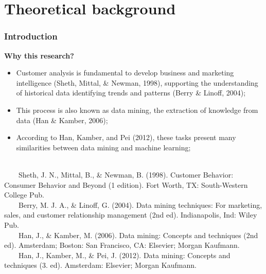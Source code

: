 \documentclass[10pt]{beamer}
\begin{document}
\section{Theoretical background}
\begin{frame}
	\frametitle{Introduction}
	\Large
	\textbf{Why this research?}\\
		\begin{itemize} \normalsize
			\item Customer analysis is fundamental to develop business and marketing intelligence \footnotesize(Sheth, Mittal, \& Newman, 1998)\normalsize, supporting the understanding of historical data identifying trends and patterns \footnotesize(Berry \& Linoff, 2004)\normalsize;
			\item This process is also known as data mining, the extraction of knowledge from data \footnotesize(Han \& Kamber, 2006)\normalsize;
			\item According to \footnotesize Han, Kamber, and Pei (2012)\normalsize, these tasks present many similarities between data mining and machine learning; \\~\\
		\end{itemize}	
	\tiny
	~~~~Sheth, J. N., Mittal, B., \& Newman, B. (1998). Customer Behavior: Consumer Behavior and Beyond (1 edition). Fort Worth, TX: South-Western College Pub. \\
	~~~~Berry, M. J. A., \& Linoff, G. (2004). Data mining techniques: For marketing, sales, and customer relationship management (2nd ed). Indianapolis, Ind: Wiley Pub.\\
	~~~~Han, J., \& Kamber, M. (2006). Data mining: Concepts and techniques (2nd ed). Amsterdam; Boston: San Francisco, CA: Elsevier; Morgan Kaufmann.\\
	~~~~Han, J., Kamber, M., \& Pei, J. (2012). Data mining: Concepts and techniques (3. ed). Amsterdam: Elsevier; Morgan Kaufmann.\\
\end{frame}
\end{document}
